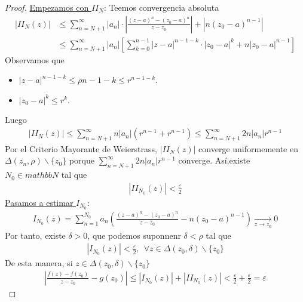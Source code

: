 \begin{proof}
    \underline{Empezamos con $II_N$}: Teemos convergencia absoluta
    \begin{align*}
        \left| II_N(z) \right| & \leq \sum_{n = N +1}^{\infty}{|a_n| \cdot \left| \frac{(z-a)^n - (z_0-a)^n}{z-z_0} \right| + \left| n(z_0-a)^{n-1}\right|} \\\
                               & \leq \sum_{n = N +1}^{\infty}{|a_n|\left[ \sum_{k=0}^{n-1}{|z-a|^{n-1-k} \cdot |z_0-a|^{k} + n|z_0-a|^{n-1}}\right]}
    \end{align*}
    Observamos que
    \begin{itemize}
        \item $|z-a|^{n-1-k} \leq \rho{n-1-k} \leq r^{n-1-k}$.
        \item $|z_0-a|^k \leq r^k$.
    \end{itemize}
    Luego
    \begin{align*}
        \left| II_N(z) \right|  \leq \sum_{n=N+1}^{\infty}{n|a_n|\left( r^{n-1} + r^{n-1}\right)} \leq \sum_{n = N+1}^{\infty}{2n|a_n|r^{n-1}}
    \end{align*}
    Por el Criterio Mayorante de Weierstrass, $|II_N(z)|$ converge uniformemente en $\Delta(z_n,\rho)\backslash \{z_0\}$ porque $\sum_{n = N+1}^{\infty}{2n|a_n|r^{n-1}}$ converge. Así,existe $N_0 \in mathbb{N}$ tal que
    \begin{align*}
        |II_{N_0}(z)| < \frac{\varepsilon}{2}
    \end{align*}
    \underline{Pasamos a estimar $I_{N_0}$}:
    \begin{align*}
        I_{N_0}(z) = \sum_{n=1}^{N_0}{a_n\left( \frac{(z-a)^n - (z_0-a)^n}{z-z_0} - n(z_0-a)^{n-1}\right)} \xrightarrow[z \to z_0]{} 0
    \end{align*}
    Por tanto, existe $\delta > 0$, que podemos suponnenr $\delta < \rho$ tal que
    \begin{align*}
        \left| I_{N_0}(z) \right| < \frac{\varepsilon}{2}, \ \ \forall z \in \Delta(z_0,\delta)\backslash \{z_0\}
    \end{align*}
    De esta manera, si $z \in \Delta(z_0,\delta)\backslash \{z_0\}$
    \begin{align*}
        \left| \frac{f(z) - f(z_0)}{z-z_0} - g(z_0) \right| \leq \left| I_{N_0}(z) \right| + \left| II_{N_0}(z) \right| < \frac{\varepsilon}{2} + \frac{\varepsilon}{2} = \varepsilon
    \end{align*}
\end{proof}

